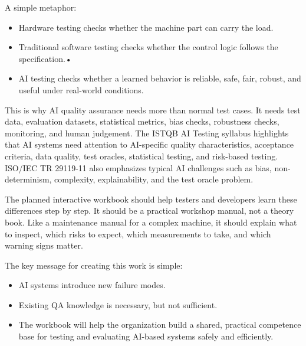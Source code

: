 \documentclass[
  letterpaper,
  DIV=11,
  numbers=noendperiod,
  oneside]{scrreprt}
\providecommand{\tightlist}{%
  \setlength{\itemsep}{0pt}\setlength{\parskip}{0pt}}
\newcounter{quartocallouttipno}
\newcommand{\quartocallouttip}[1]{\refstepcounter{quartocallouttipno}\label{#1}}
\begin{document}
A simple metaphor:

\begin{itemize}
\tightlist
\item
  Hardware testing checks whether the machine part can carry the load.
\item
  Traditional software testing checks whether the control logic follows
  the specification.•
\item
  AI testing checks whether a learned behavior is reliable, safe, fair,
  robust, and useful under real-world conditions.
\end{itemize}

This is why AI quality assurance needs more than normal test cases. It
needs test data, evaluation datasets, statistical metrics, bias checks,
robustness checks, monitoring, and human judgement. The ISTQB AI Testing
syllabus highlights that AI systems need attention to AI-specific
quality characteristics, acceptance criteria, data quality, test
oracles, statistical testing, and risk-based testing. ISO/IEC TR
29119-11 also emphasizes typical AI challenges such as bias,
non-determinism, complexity, explainability, and the test oracle
problem.

The planned interactive workbook should help testers and developers
learn these differences step by step. It should be a practical workshop
manual, not a theory book. Like a maintenance manual for a complex
machine, it should explain what to inspect, which risks to expect, which
measurements to take, and which warning signs matter.

The key message for creating this work is simple:

\begin{tcolorbox}[enhanced jigsaw, arc=.35mm, bottomrule=.15mm, bottomtitle=1mm, breakable, colback=white, colbacktitle=quarto-callout-tip-color!10!white, colframe=quarto-callout-tip-color-frame, coltitle=black, left=2mm, leftrule=.75mm, opacityback=0, opacitybacktitle=0.6, rightrule=.15mm, title=\textcolor{quarto-callout-tip-color}{\faLightbulb}\hspace{0.5em}{Tip \ref*{tip-why-workbook}: Why a AI-QA Workbook?}, titlerule=0mm, toprule=.15mm, toptitle=1mm]

\quartocallouttip{tip-why-workbook} 

\begin{itemize}
\tightlist
\item
  AI systems introduce new failure modes.
\item
  Existing QA knowledge is necessary, but not sufficient.
\item
  The workbook will help the organization build a shared, practical
  competence base for testing and evaluating AI-based systems safely and
  efficiently.
\end{itemize}

\end{tcolorbox}
\end{document}
